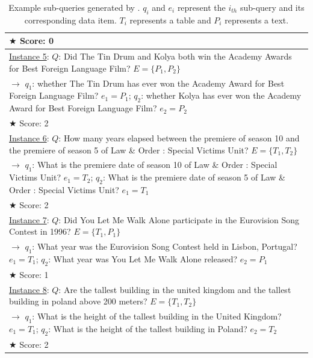 \begin{table}[!t]
{{\begin{tabular}{p{15cm}}
$\bigstar$ Score: 0 \\
\hline
\underline{Instance 5}: $Q$: Did The Tin Drum and Kolya both win the Academy Awards for Best Foreign Language Film? $E = \{P_1, P_2\}$ \\
$\rightarrow$ $q_1$: whether The Tin Drum has ever won the Academy Award for Best Foreign Language Film? $e_1 = P_1$; $q_2$: whether Kolya has ever won the Academy Award for Best Foreign Language Film? $e_2 = P_2$ \\
$\bigstar$ Score: 2 \\
\hline
\underline{Instance 6}: $Q$: How many years elapsed between the premiere of season 10 and the premiere of season 5 of Law \& Order : Special Victims Unit? $E = \{T_1, T_2\}$ \\
$\rightarrow$ $q_1$: What is the premiere date of season 10 of Law \& Order : Special Victims Unit? $e_1 = T_2$; $q_2$: What is the premiere date of season 5 of Law \& Order : Special Victims Unit? $e_1 = T_1$ \\
$\bigstar$ Score: 2 \\
\hline
\underline{Instance 7}: $Q$: Did You Let Me Walk Alone participate in the Eurovision Song Contest in 1996? $E = \{T_1, P_1\}$ \\
$\rightarrow$ $q_1$: What year was the Eurovision Song Contest held in Lisbon, Portugal? $e_1 = T_1$; $q_2$: What year was You Let Me Walk Alone released? $e_2 = P_1$ \\
$\bigstar$ Score: 1 \\
\hline
\underline{Instance 8}: $Q$: Are the tallest building in the united kingdom and the tallest building in poland above 200 meters? $E = \{T_1, T_2\}$\\
$\rightarrow$ $q_1$: What is the height of the tallest building in the United Kingdom? $e_1 = T_1$; $q_2$: What is the height of the tallest building in Poland? $e_2 = T_2$ \\
$\bigstar$ Score: 2 \\
\hline
\end{tabular}
}
}
\caption{Example sub-queries generated by \sys. $q_i$ and $e_i$ represent the $i_{th}$ sub-query and its corresponding data item. $T_i$ represents a table and $P_i$ represents a text. 
}
\label{tab:results_of_decomposition}
\end{table}



